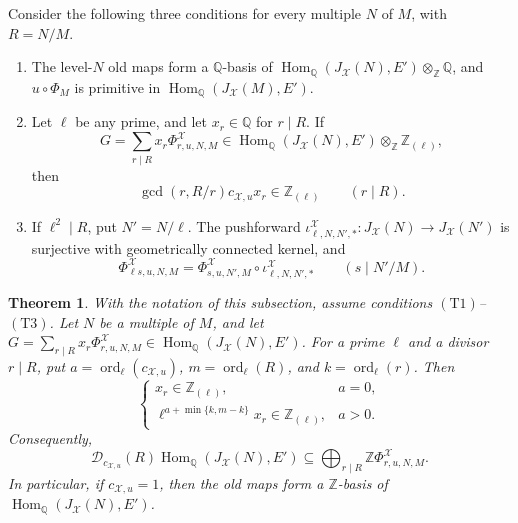 \documentclass[12pt, letterpaper]{amsart}
\newtheorem{theorem}{Theorem}[section]
\theoremstyle{definition}
\theoremstyle{remark}
\newcommand{\Q}{\mathbb Q}
\newcommand{\Z}{\mathbb Z}
\newcommand{\Hom}{\operatorname{Hom}}
\DeclareMathOperator{\ord}{ord}
\numberwithin{equation}{section}
\begin{document}
Consider the following three conditions for every multiple \(N\) of \(M\), with
\(R=N/M\).
\begin{enumerate}
\item[{\raisebox{\baselineskip}[0pt][0pt]{\hypertarget{tower-condition-T1}{}}\(\mathrm{(T1)}\)}] The level-\(N\) old maps form a \(\Q\)-basis of
\(\Hom_\Q(J_{\mathcal X}(N),E')\otimes_\Z\Q\), and \(u\circ\Phi_M\) is
primitive in \(\Hom_\Q(J_{\mathcal X}(M),E')\).

\item[{\raisebox{\baselineskip}[0pt][0pt]{\hypertarget{tower-condition-T2}{}}\(\mathrm{(T2)}\)}] Let \(\ell\) be any prime, and let \(x_r\in\Q\) for
\(r\mid R\). If
\[
        G=\sum_{r\mid R}x_r\Phi^{\mathcal X}_{r,u,N,M}
        \in\Hom_\Q(J_{\mathcal X}(N),E')\otimes_\Z\Z_{(\ell)},
\]
then
\begin{equation}\label{eq:tower-two-cusp-bound}
        \gcd(r,R/r)c_{\mathcal X,u}x_r\in\Z_{(\ell)}
        \qquad(r\mid R).
\end{equation}

\item[{\raisebox{\baselineskip}[0pt][0pt]{\hypertarget{tower-condition-T3}{}}\(\mathrm{(T3)}\)}] If \(\ell^2\mid R\), put \(N'=N/\ell\). The pushforward
\(\iota^{\mathcal X}_{\ell,N,N',*}:J_{\mathcal X}(N)\to
J_{\mathcal X}(N')\) is surjective with geometrically connected kernel, and
\[
        \Phi^{\mathcal X}_{\ell s,u,N,M}
        =
        \Phi^{\mathcal X}_{s,u,N',M}
        \circ\iota^{\mathcal X}_{\ell,N,N',*}
        \qquad(s\mid N'/M).
\]
\end{enumerate}

\begin{theorem}\label{thm:tower-denominator-criterion}
With the notation of this subsection, assume conditions
\hyperlink{tower-condition-T1}{\(\mathrm{(T1)}\)}--\hyperlink{tower-condition-T3}{\(\mathrm{(T3)}\)}.
Let \(N\) be a multiple of \(M\), and let
\(G=\sum_{r\mid R}x_r\Phi^{\mathcal X}_{r,u,N,M}
\in\Hom_\Q(J_{\mathcal X}(N),E')\).
For a prime \(\ell\) and a divisor \(r\mid R\), put
\(a=\ord_\ell(c_{\mathcal X,u})\), \(m=\ord_\ell(R)\), and
\(k=\ord_\ell(r)\).
Then
\begin{equation}\label{eq:tower-coordinate-bound}
        \begin{cases}
        x_r\in\Z_{(\ell)},&a=0,\\[2mm]
        \ell^{a+\min\{k,m-k\}}x_r\in\Z_{(\ell)},&a>0.
        \end{cases}
\end{equation}
Consequently,
\begin{equation}\label{eq:tower-sharp-lattice}
        \mathcal D_{c_{\mathcal X,u}}(R)
        \Hom_\Q(J_{\mathcal X}(N),E')
        \subseteq
        \bigoplus_{r\mid R}\Z\Phi^{\mathcal X}_{r,u,N,M}.
\end{equation}
In particular, if \(c_{\mathcal X,u}=1\), then the old maps form a
\(\Z\)-basis of \(\Hom_\Q(J_{\mathcal X}(N),E')\).
\end{theorem}
\end{document}
